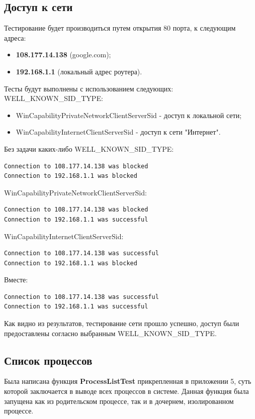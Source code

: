 \subsection{Доступ к сети}
Тестирование будет производиться путем открытия 80 порта, к следующим адреса:
\begin{itemize}
\item \textbf{108.177.14.138} (google.com);
\item \textbf{192.168.1.1} (локальный адрес роутера).
\end{itemize}
Тесты будут выполнены с использованием следующих: WELL\_KNOWN\_SID\_TYPE:
\begin{itemize}
\item WinCapabilityPrivateNetworkClientServerSid - доступ к локальной сети;
\item WinCapabilityInternetClientServerSid - доступ к сети "Интернет".
\end{itemize}
Без задачи каких-либо WELL\_KNOWN\_SID\_TYPE:
\begin{lstlisting}[language={}, caption={Полный запрет сети}]
Connection to 108.177.14.138 was blocked
Connection to 192.168.1.1 was blocked
\end{lstlisting}
WinCapabilityPrivateNetworkClientServerSid:
\begin{lstlisting}[language={}, caption={Доступ только к локальной сети}]
Connection to 108.177.14.138 was blocked
Connection to 192.168.1.1 was successful
\end{lstlisting}
WinCapabilityInternetClientServerSid:
\begin{lstlisting}[language={}, caption={Доступ только к сети "Интернет"}]
Connection to 108.177.14.138 was successful
Connection to 192.168.1.1 was blocked
\end{lstlisting}
Вместе:
\begin{lstlisting}[language={}, caption={Полный доступ к сети}]
Connection to 108.177.14.138 was successful
Connection to 192.168.1.1 was successful
\end{lstlisting}
Как видно из результатов, тестирование сети прошло успешно, доступ были предоставлены согласно выбранным WELL\_KNOWN\_SID\_TYPE.

\subsection{Список процессов}
Была написана функция \textbf{ProcessListTest} прикрепленная в приложении 5, суть которой заключается в выводе всех процессов в системе. Данная функция была запущена как из родительском процессе, так и в дочернем, изолированном процессе.


